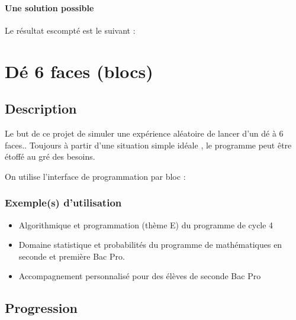 \documentclass[letterpaper,10pt,french]{sphinxmanual}
\begin{document}
\paragraph{Une solution possible}
\label{\detokenize{decouverte/pileface-bloc3:une-solution-possible}}
Le résultat escompté est le suivant :

\noindent{}


\section{Dé 6 faces (blocs)}
\label{\detokenize{decouverte/de6faces-bloc:blocde6faces}}\label{\detokenize{decouverte/de6faces-bloc::doc}}\label{\detokenize{decouverte/de6faces-bloc:de-6-faces-blocs}}

\subsection{Description}
\label{\detokenize{decouverte/de6faces-bloc:description}}
Le but de ce projet de simuler une expérience aléatoire de lancer d’un dé à 6 faces..
Toujours à partir d’une situation simple idéale , le programme peut être étoffé au gré des besoins.

On utilise l’interface de programmation par bloc :



\subsubsection{Exemple(s) d’utilisation}
\label{\detokenize{decouverte/de6faces-bloc:exemple-s-d-utilisation}}\begin{itemize}
\item {} 
Algorithmique et programmation (thème E) du programme de cycle 4

\item {} 
Domaine statistique et probabilités du programme de mathématiques en seconde et première Bac Pro.

\item {} 
Accompagnement personnalisé pour des élèves de seconde Bac Pro

\end{itemize}


\subsection{Progression}
\label{\detokenize{decouverte/de6faces-bloc:progression}}
\end{document}
